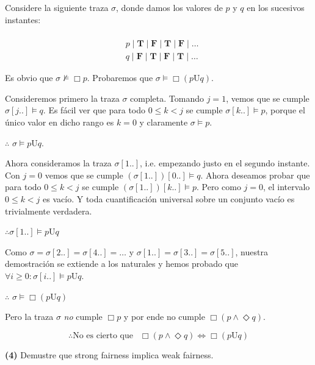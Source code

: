 \documentclass[a4paper, 12pt]{article}
\begin{document}
Considere la siguiente traza $\sigma$, donde damos los valores de $p$ y $q$ en
los sucesivos instantes:

\begin{align*} \\ 
    &p \mid \textbf{T} \mid \textbf{F} \mid \textbf{T} \mid \textbf{F} \mid \ldots\\ 
    &q \mid \textbf{F}\mid \textbf{T} \mid \textbf{F} \mid \textbf{T} \mid \ldots
\end{align*}

Es obvio que $\sigma \not\vDash \Box p$. Probaremos que $\sigma \vDash \Box (p
\text{U} q)$.

Consideremos primero la traza $\sigma$ completa. Tomando $j = 1$, vemos que se
cumple $\sigma[j..] \vDash q$. Es fácil ver que para todo $0 \leq k < j$ se
cumple $\sigma[k..] \vDash p$, porque el único valor en dicho rango es $k = 0$ y
claramente $\sigma \vDash p$. 

$\therefore $ $\sigma \vDash p \text{U} q$.

Ahora consideramos la traza $\sigma[1..]$, i.e. empezando justo en el segundo
instante. Con $j = 0$ vemos que se cumple $(\sigma[1..])[0..] \vDash q$. Ahora
deseamos probar que para todo $0 \leq k < j$  se cumple $(\sigma[1..])[k..]
\vDash p$. Pero como $j = 0$, el intervalo $0 \leq k < j$ es vacío. Y toda
cuantificación universal sobre un conjunto vacío es trivialmente verdadera. 

$\therefore \sigma[1..] \vDash p \text{U} q$

Como $\sigma = \sigma[2..] = \sigma[4..] = \ldots$ y $\sigma[1..] =
\sigma[3..] = \sigma[5..]$, nuestra demostración se extiende a los naturales y
hemos probado que $\forall  i \geq 0: \sigma[i..] \vDash p \text{U} q$. 

$\therefore $ $\sigma \vDash \Box (p \text{U} q)$

Pero la traza $\sigma$ \textit{no} cumple $\Box p$ y por ende no cumple $\Box (p
\land \Diamond q)$. 

    \begin{equation*}
        \therefore \text{No es cierto que } ~ ~  \Box (p \land  \Diamond  q) \iff \Box (p \text{U} q)
    \end{equation*}


\pagebreak 

\begin{myframe}
    \textbf{(4)} Demustre que strong fairness implica weak fairness.
\end{myframe}
\end{document}
